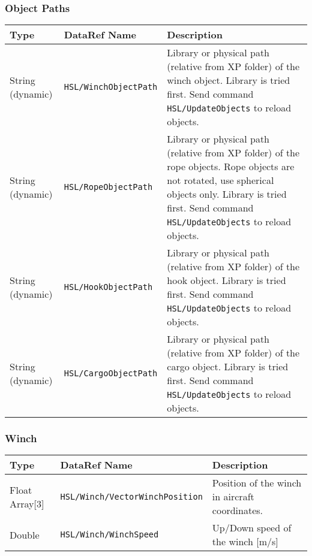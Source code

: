 \documentclass[10pt,a4]{scrartcl}
\begin{document}
\subsubsection{Object Paths}

\begin{tabularx}{\linewidth}{| l | l | X |} \hline
\textbf{Type} & \textbf{DataRef Name}& \textbf{Description}\\ \hline
String (dynamic) & \texttt{HSL/WinchObjectPath} & Library or physical path (relative from XP folder) of the winch object. Library is tried first. Send command \texttt{HSL/UpdateObjects} to reload objects.\\ \hline
String (dynamic) & \texttt{HSL/RopeObjectPath} &  Library or physical path (relative from XP folder) of the rope objects. Rope objects are not rotated, use spherical objects only. Library is tried first. Send command \texttt{HSL/UpdateObjects} to reload objects.\\ \hline
String (dynamic) & \texttt{HSL/HookObjectPath} &  Library or physical path (relative from XP folder) of the hook object. Library is tried first. Send command \texttt{HSL/UpdateObjects} to reload objects.\\ \hline
String (dynamic) & \texttt{HSL/CargoObjectPath} & Library or physical path (relative from XP folder)  of the cargo object. Library is tried first. Send command \texttt{HSL/UpdateObjects} to reload objects.\\ \hline
\end{tabularx}
\subsubsection{Winch}
\begin{tabularx}{\linewidth}{| l | l | X |} \hline
\textbf{Type} & \textbf{DataRef Name}& \textbf{Description}\\ \hline
Float Array[3] & \texttt{HSL/Winch/VectorWinchPosition} & Position of the winch in aircraft coordinates.\\ \hline
Double & \texttt{HSL/Winch/WinchSpeed} &  Up/Down speed of the winch [m/s]\\ \hline
\end{tabularx}
\end{document}
